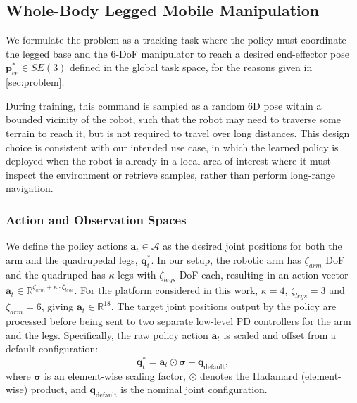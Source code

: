 \subsection{Whole-Body Legged Mobile Manipulation}\label{sec:command}

We formulate the problem as a tracking task where the policy must coordinate the legged
base and the 6-DoF manipulator to reach a desired end-effector pose $\boldsymbol{p}_{ee}^* \in SE(3)$ defined in the global task space, for the reasons given in \cref{sec:problem}.

During training, this command is sampled as a random 6D pose within a bounded vicinity of the robot, such that the robot may need to traverse some terrain to reach it, but is not required to travel over long distances. This design choice is consistent with our intended use case, in which the learned policy is deployed when the robot is already in a local area of interest where it must inspect the environment or retrieve samples, rather than perform long-range navigation.

\subsubsection{Action and Observation Spaces}
\label{sec:spaces}

We define the policy actions $\boldsymbol{a}_t \in \mathcal{A}$ as the desired joint positions for both the arm and the quadrupedal legs, $\boldsymbol{q}_t^*$. In our setup, the robotic arm has $\zeta_{arm}$ DoF and the quadruped has $\kappa$ legs with $\zeta_{legs}$ DoF each, resulting in an action vector $ \boldsymbol{a}_t \in \mathbb{R}^{\zeta_{arm}+\kappa \cdot \zeta_{legs}} $. For the platform considered in this work, $\kappa=4$, $\zeta_{legs}=3$ and $\zeta_{arm}=6$, giving $\boldsymbol{a}_t \in \mathbb{R}^{18}$. The target joint positions output by the policy are processed before being sent to two separate low-level PD controllers for the arm and the legs. Specifically, the raw policy action $\boldsymbol{a}_t$ is scaled and offset from a default configuration:
%
\begin{equation}\label{eq:action-scaling}
    \boldsymbol{q}_t^{*} = \boldsymbol{a}_t \odot \boldsymbol{\sigma} + \boldsymbol{q}_{\text{default}},
\end{equation}
%
where $\boldsymbol{\sigma}$ is an element-wise scaling factor, $\odot$ denotes the Hadamard (element-wise) product, and $\boldsymbol{q}_{\text{default}}$ is the nominal joint configuration.


